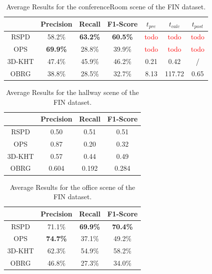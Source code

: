 \documentclass[main.tex]{subfiles}
\begin{document}
\begin{table}[]
    \centering
    \begin{tabular}{c|cccccc}
               & Precision & Recall & F1-Score & $t_{pre}$             & $t_{calc}$            & $t_{post}$            \\ \hline
        RSPD   & 58.2\%    & \textbf{63.2\%} & \textbf{60.5\%}   & \textcolor{red}{todo} & \textcolor{red}{todo} & \textcolor{red}{todo} \\
        OPS    & \textbf{69.9\%}    & 28.8\% & 39.9\%   & \textcolor{red}{todo} & \textcolor{red}{todo} & \textcolor{red}{todo} \\
        3D-KHT & 47.4\%    & 45.9\% & 46.2\%   & 0.21                  & 0.42                  & /                     \\
        OBRG   & 38.8\%    & 28.5\% & 32.7\%   & 8.13                  & 117.72                & 0.65
    \end{tabular}%
    \caption{Average Results for the conferenceRoom scene of the FIN dataset.}
    \label{tab:res-fin-conf}
\end{table}

\begin{table}[]
    \centering
    \begin{tabular}{c|ccc}
               & Precision & Recall & F1-Score \\ \hline
        RSPD   & 0.50      & 0.51   & 0.51     \\
        OPS    & 0.87      & 0.20   & 0.32     \\
        3D-KHT & 0.57      & 0.44   & 0.49     \\
        OBRG   & 0.604     & 0.192  & 0.284
    \end{tabular}%
    \caption{Average Results for the hallway scene of the FIN dataset.}
    \label{tab:res-fin-hall}
\end{table}

\begin{table}[]
    \centering
    \begin{tabular}{c|ccc}
               & Precision & Recall & F1-Score \\ \hline
        RSPD   & 71.1\%    & \textbf{69.9\%} & \textbf{70.4\%}   \\
        OPS    & \textbf{74.7\%}    & 37.1\% & 49.2\%   \\
        3D-KHT & 62.3\%    & 54.9\% & 58.2\%   \\
        OBRG   & 46.8\%    & 27.3\% & 34.0\%
    \end{tabular}
    \caption{Average Results for the office scene of the FIN dataset.}
    \label{tab:res-fin-off}
\end{table}
\end{document}
